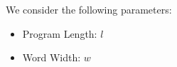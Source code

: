We consider the following parameters:
\begin{itemize}
\item{Program Length: $l$}
\item{Word Width: $w$}




\end{itemize}
